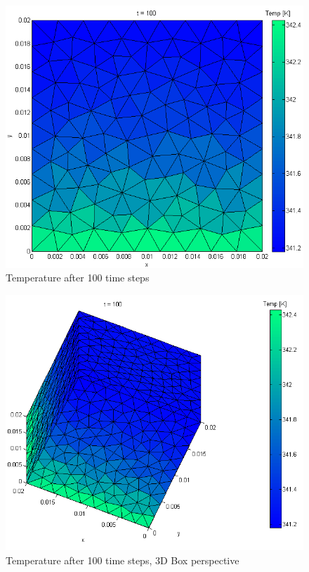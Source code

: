 \documentclass[12pt]{article}
\begin{document}
	\begin{figure}[H]
    \includegraphics[scale=0.5]{matlab-results/5.png}
    \centering
    \caption{Temperature after 100 time steps}
	\end{figure}	
	\begin{figure}[H]
    \includegraphics[scale=0.5]{matlab-results/7.png}
    \centering
    \caption{Temperature after 100 time steps, 3D Box perspective}
	\end{figure}	
\end{document}
